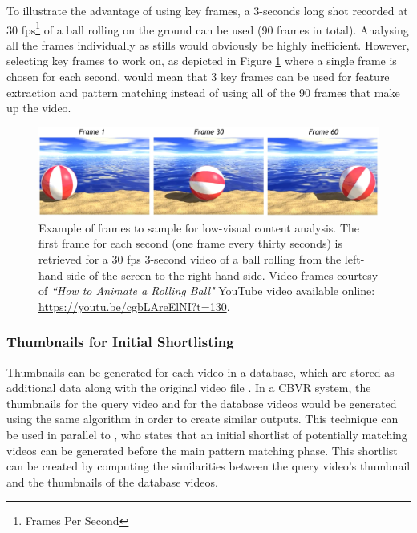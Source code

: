 To illustrate the advantage of using key frames, a 3-seconds long shot recorded at 30 fps\footnote{Frames Per Second} of a ball rolling on the ground can be used (90 frames in total). Analysing all the frames individually as stills would obviously be highly inefficient. However, selecting key frames to work on, as depicted in Figure \ref{fig:rolling_ball} where a single frame is chosen for each second, would mean that 3 key frames can be used for feature extraction and pattern matching instead of using all of the 90 frames that make up the video.\\

\begin{figure}[h]
\centerline{\includegraphics[width=\textwidth]{figures/ball_rolling.jpg}}
\caption{\label{fig:rolling_ball}Example of frames to sample for low-visual content analysis. The first frame for each second (one frame every thirty seconds) is retrieved for a 30 fps 3-second video of a ball rolling from the left-hand side of the screen to the right-hand side. Video frames courtesy of \textit{``How to Animate a Rolling Ball"} YouTube video available online: \url{https://youtu.be/cgbLAreElNI?t=130}.}
\end{figure}

\subsubsection{Thumbnails for Initial Shortlisting}

Thumbnails can be generated for each video in a database, which are stored as additional data along with the original video file \cite{okabe2018animating}. In a CBVR system, the thumbnails for the query video and for the database videos would be generated using the same algorithm in order to create similar outputs. This technique can be used in parallel to \cite{araujo2017i2v}, who states that an initial shortlist of potentially matching videos can be generated before the main pattern matching phase. This shortlist can be created by computing the similarities between the query video's thumbnail and the thumbnails of the database videos.\\

